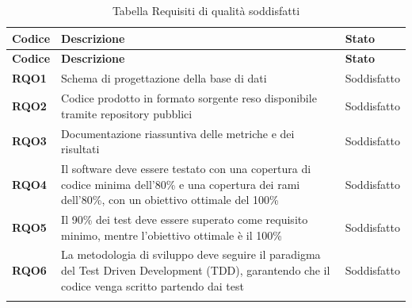 \begin{longtable}{|>{\centering\arraybackslash}m{}|>{\centering\arraybackslash}m{}|>{\centering\arraybackslash}m{}|}
	\hline
	\textbf{Codice} & \textbf{Descrizione} & \textbf{Stato}\\\hline
	\endfirsthead
	\hline
	\textbf{Codice} & \textbf{Descrizione} & \textbf{Stato}\\\hline
	\endhead
	\hline
    \textbf{RQO1} & Schema di progettazione della base di dati & Soddisfatto \\
    \hline
    \textbf{RQO2} & Codice prodotto in formato sorgente reso disponibile tramite repository pubblici & Soddisfatto \\
    \hline
    \textbf{RQO3} & Documentazione riassuntiva delle metriche e dei risultati & Soddisfatto \\
    \hline
    \textbf{RQO4} & Il software deve essere testato con una copertura di codice minima dell'80\% e una copertura dei rami dell'80\%, con un obiettivo ottimale del 100\% & Soddisfatto \\
    \hline
    \textbf{RQO5} & Il 90\% dei test deve essere superato come requisito minimo, mentre l'obiettivo ottimale è il 100\% & Soddisfatto \\
    \hline
    \textbf{RQO6} & La metodologia di sviluppo deve seguire il paradigma del Test Driven Development (TDD), garantendo che il codice venga scritto partendo dai test & Soddisfatto \\
    \hline

\caption{Tabella Requisiti di qualità soddisfatti}
\end{longtable}


